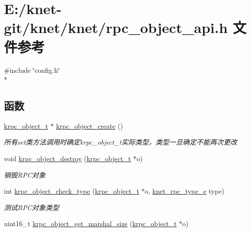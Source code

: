 \hypertarget{a00097}{}\section{E\+:/knet-\/git/knet/knet/rpc\+\_\+object\+\_\+api.h 文件参考}
\label{a00097}
{\ttfamily \#include \char`\"{}config.\+h\char`\"{}}\\*
\subsection*{函数}
\begin{DoxyCompactItemize}
\item 
\hyperlink{a00056_a9c07dfc8c3b965f75b09f82fdb1bbb1e_a9c07dfc8c3b965f75b09f82fdb1bbb1e}{krpc\+\_\+object\+\_\+t} $\ast$ \hyperlink{a00119_ga6aad58d8460944596e39822181bf4848_ga6aad58d8460944596e39822181bf4848}{krpc\+\_\+object\+\_\+create} ()
\begin{DoxyCompactList}\small\item\em 所有set类方法调用时确定krpc\+\_\+object\+\_\+t实际类型，类型一旦确定不能再次更改 \end{DoxyCompactList}\item 
void \hyperlink{a00119_ga8bb578f8ba5a8de682a1fe2a4c8a20f6_ga8bb578f8ba5a8de682a1fe2a4c8a20f6}{krpc\+\_\+object\+\_\+destroy} (\hyperlink{a00056_a9c07dfc8c3b965f75b09f82fdb1bbb1e_a9c07dfc8c3b965f75b09f82fdb1bbb1e}{krpc\+\_\+object\+\_\+t} $\ast$o)
\begin{DoxyCompactList}\small\item\em 销毁\+R\+P\+C对象 \end{DoxyCompactList}\item 
int \hyperlink{a00119_gac0a05f116ee7164ceebf6f7fabcf46cf_gac0a05f116ee7164ceebf6f7fabcf46cf}{krpc\+\_\+object\+\_\+check\+\_\+type} (\hyperlink{a00056_a9c07dfc8c3b965f75b09f82fdb1bbb1e_a9c07dfc8c3b965f75b09f82fdb1bbb1e}{krpc\+\_\+object\+\_\+t} $\ast$o, \hyperlink{a00056_a6fe1ebc0ddea56dd3c337115c1e10bc4_a6fe1ebc0ddea56dd3c337115c1e10bc4}{knet\+\_\+rpc\+\_\+type\+\_\+e} type)
\begin{DoxyCompactList}\small\item\em 测试\+R\+P\+C对象类型 \end{DoxyCompactList}\item 
uint16\+\_\+t \hyperlink{a00119_gad51ebf7392be0ee1fd9597aa22a43015_gad51ebf7392be0ee1fd9597aa22a43015}{krpc\+\_\+object\+\_\+get\+\_\+marshal\+\_\+size} (\hyperlink{a00056_a9c07dfc8c3b965f75b09f82fdb1bbb1e_a9c07dfc8c3b965f75b09f82fdb1bbb1e}{krpc\+\_\+object\+\_\+t} $\ast$o)

\end{DoxyCompactItemize}
